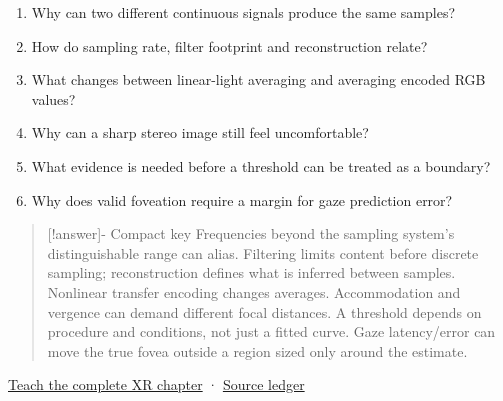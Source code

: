 \begin{enumerate}
\def\labelenumi{\arabic{enumi}.}
\tightlist
\item
  Why can two different continuous signals produce the same samples?
\item
  How do sampling rate, filter footprint and reconstruction relate?
\item
  What changes between linear-light averaging and averaging encoded RGB values?
\item
  Why can a sharp stereo image still feel uncomfortable?
\item
  What evidence is needed before a threshold can be treated as a boundary?
\item
  Why does valid foveation require a margin for gaze prediction error?
\end{enumerate}

\begin{quote}
{[}!answer{]}- Compact key Frequencies beyond the sampling system's distinguishable range can alias. Filtering limits content before discrete sampling; reconstruction defines what is inferred between samples. Nonlinear transfer encoding changes averages. Accommodation and vergence can demand different focal distances. A threshold depends on procedure and conditions, not just a fitted curve. Gaze latency/error can move the true fovea outside a region sized only around the estimate.
\end{quote}

\hyperref[04-visual-computing-ii-ch042-sampling-is-a-question-of-what-remains-distinguishable]{Teach the complete XR chapter} · \hyperref[appendix-fd090d982a15-xr01---independent-seeing-and-representation-source]{Source ledger}
